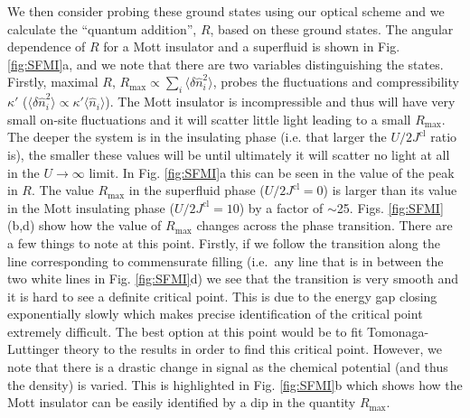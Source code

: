 We then consider probing these ground states using our optical scheme
and we calculate the ``quantum addition'', $R$, based on these ground
states. The angular dependence of $R$ for a Mott insulator and a
superfluid is shown in Fig. \ref{fig:SFMI}a, and we note that there
are two variables distinguishing the states. Firstly, maximal $R$,
$R_\text{max} \propto \sum_i \langle \delta \hat{n}_i^2 \rangle$,
probes the fluctuations and compressibility $\kappa'$
($\langle \delta \hat{n}^2_i \rangle \propto \kappa' \langle \hat{n}_i
\rangle$).  The Mott insulator is incompressible and thus will have
very small on-site fluctuations and it will scatter little light
leading to a small $R_\text{max}$. The deeper the system is in the
insulating phase (i.e. that larger the $U/2J^\text{cl}$ ratio is), the
smaller these values will be until ultimately it will scatter no light
at all in the $U \rightarrow \infty$ limit. In Fig. \ref{fig:SFMI}a
this can be seen in the value of the peak in $R$. The value
$R_\text{max}$ in the superfluid phase ($U/2J^\text{cl} = 0$) is
larger than its value in the Mott insulating phase
($U/2J^\text{cl} = 10$) by a factor of
$\sim$25. Figs. \ref{fig:SFMI}(b,d) show how the value of
$R_\text{max}$ changes across the phase transition. There are a few
things to note at this point. Firstly, if we follow the transition
along the line corresponding to commensurate filling (i.e.~any line
that is in between the two white lines in Fig. \ref{fig:SFMI}d) we see
that the transition is very smooth and it is hard to see a definite
critical point. This is due to the energy gap closing exponentially
slowly which makes precise identification of the critical point
extremely difficult. The best option at this point would be to fit
Tomonaga-Luttinger theory to the results in order to find this
critical point. However, we note that there is a drastic change in
signal as the chemical potential (and thus the density) is
varied. This is highlighted in Fig. \ref{fig:SFMI}b which shows how
the Mott insulator can be easily identified by a dip in the quantity
$R_\text{max}$.

